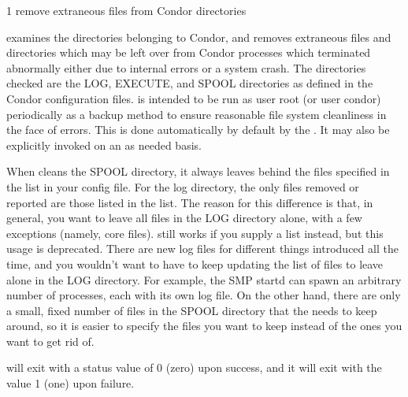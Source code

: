 \begin{ManPage}{\label{man-condor-preen}}{1}
{remove extraneous files from Condor directories}
\Synopsis {}


\Description 

 examines the directories belonging to Condor, 
and removes extraneous files and directories which may be left over from
Condor processes which terminated abnormally either due to internal errors or
a system crash. The directories checked are the LOG, EXECUTE, and SPOOL
directories as defined in the Condor configuration files.  is
intended to be run as user root (or user condor) periodically as a backup
method to ensure reasonable file system cleanliness in the face of
errors. This is done automatically by default by the . 
It may also be explicitly invoked on an as needed basis.

When  cleans the SPOOL directory, it always leaves
behind the files specified in the  list in
your config file.
For the log directory, the only files removed or reported are those
listed in the   list.
The reason for this difference is that, in general, you want to leave
all files in the LOG directory alone, with a few exceptions (namely,
core files).
 still works if you supply a 
list instead, but this usage is deprecated.
There are new log files for different things introduced all the time,
and you wouldn't want to have to keep updating the list of files to
leave alone in the LOG directory.
For example, the SMP startd can spawn an arbitrary number of
 processes, each with its own log file.  
On the other hand, there are only a small, fixed number of files in
the SPOOL directory that the  needs to keep around, so
it is easier to specify the files you want to keep instead of the ones
you want to get rid of.

\begin{Options}




\end{Options}

\ExitStatus

 will exit with a status value of 0 (zero) upon success,
and it will exit with the value 1 (one) upon failure.

\end{ManPage}
